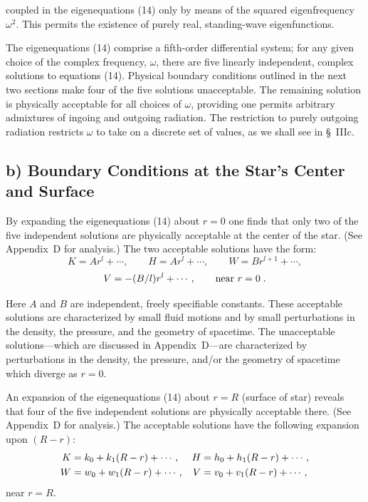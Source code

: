 coupled in the eigenequations (14) only by means of the squared eigenfrequency $\omega^2$.
This permits the existence of purely real, standing-wave eigenfunctions.

The eigenequations (14) comprise a fifth-order differential system; for any given
choice of the complex frequency, $\omega$, there are five linearly independent, complex solutions
to equations (14). Physical boundary conditions outlined in the next two sections
make four of the five solutions unacceptable. The remaining solution is physically acceptable for all choices of $\omega$, providing one permits arbitrary admixtures of ingoing and
outgoing radiation. The restriction to purely outgoing radiation restricts $\omega$ to take on a
discrete set of values, as we shall see in \S~IIIc.

\subsection*{b) Boundary Conditions at the Star's Center and Surface}

By expanding the eigenequations (14) about $r = 0$ one finds that only two of the
five independent solutions are physically acceptable at the center of the star. (See
Appendix~D for analysis.) The two acceptable solutions have the form:
\begin{equation}
  K = Ar^l + \cdots, \qquad
  H = Ar^l + \cdots, \qquad
  W = Br^{l+1} + \cdots,
\label{eq:15a}
\end{equation}
\begin{equation}
  V = -(B/l)r^l + \cdots, \qquad \text{near } r = 0\;.
\notag
\end{equation}

Here $A$ and $B$ are independent, freely specifiable constants. These acceptable solutions
are characterized by small fluid motions and by small perturbations in the density, the
pressure, and the geometry of spacetime. The unacceptable solutions---which are discussed in Appendix~D---are characterized by perturbations in the density, the pressure,
and/or the geometry of spacetime which diverge as $r = 0$.

An expansion of the eigenequations (14) about $r = R$ (surface of star) reveals that
four of the five independent solutions are physically acceptable there. (See Appendix~D
for analysis.) The acceptable solutions have the following expansion upon $(R - r)$:
\begin{align}
  K &= k_0 + k_1(R-r) + \cdots, &
  H &= h_0 + h_1(R-r) + \cdots, \notag \\
  W &= w_0 + w_1(R-r) + \cdots, &
  V &= v_0 + v_1(R-r) + \cdots,
\label{eq:15b}
\end{align}
near $r = R$.

